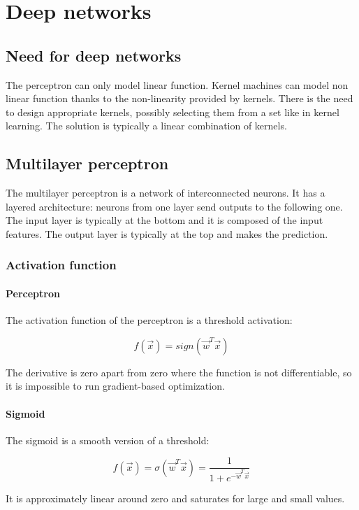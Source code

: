 \chapter{Deep networks}

\section{Need for deep networks}
The perceptron can only model linear function.
Kernel machines can model non linear function thanks to the non-linearity provided by kernels.
There is the need to design appropriate kernels, possibly selecting them from a set like in kernel learning.
The solution is typically a linear combination of kernels.

\section{Multilayer perceptron}
The multilayer perceptron is a network of interconnected neurons.
It has a layered architecture: neurons from one layer send outputs to the following one.
The input layer is typically at the bottom and it is composed of the input features.
The output layer is typically at the top and makes the prediction.

	\subsection{Activation function}

		\subsubsection{Perceptron}
		The activation function of the perceptron is a threshold activation:

		$$f(\vec{x}) = sign(\vec{w}^T\vec{x})$$

		The derivative is zero apart from zero where the function is not differentiable, so it is impossible to run gradient-based optimization.

		\subsubsection{Sigmoid}
		The sigmoid is a smooth version of a threshold:

		$$f(\vec{x}) = \sigma(\vec{w}^T\vec{x}) = \frac{1}{1+e^{-\vec{w}^T\vec{x}}}$$

		It is approximately linear around zero and saturates for large and small values.

